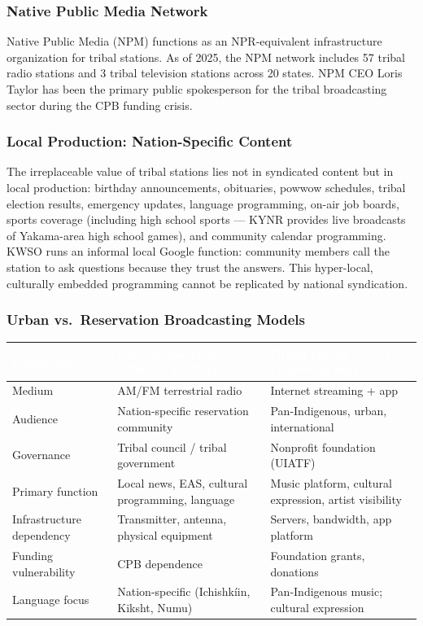\documentclass[11pt,letterpaper]{article}
\newcommand{\tableheader}[1]{\textbf{\sffamily\textcolor{white}{#1}}}
\begin{document}
\subsubsection{Native Public Media Network}

Native Public Media (NPM) functions as an NPR-equivalent infrastructure organization for tribal stations. As of 2025, the NPM network includes 57 tribal radio stations and 3 tribal television stations across 20 states. NPM CEO Loris Taylor has been the primary public spokesperson for the tribal broadcasting sector during the CPB funding crisis.

\subsubsection{Local Production: Nation-Specific Content}

The irreplaceable value of tribal stations lies not in syndicated content but in local production: birthday announcements, obituaries, powwow schedules, tribal election results, emergency updates, language programming, on-air job boards, sports coverage (including high school sports --- KYNR provides live broadcasts of Yakama-area high school games), and community calendar programming. KWSO runs an informal local Google function: community members call the station to ask questions because they trust the answers. This hyper-local, culturally embedded programming cannot be replicated by national syndication.

\subsubsection{Urban vs.\ Reservation Broadcasting Models}

\begin{center}
\begin{tabularx}{\textwidth}{L{3cm}L{4.5cm}L{4.5cm}}
\toprule
{}
\tableheader{Dimension} & \tableheader{Reservation Model (KWSO, KYNR)} & \tableheader{Urban Online Model (Daybreak Star)} \\
\midrule
Medium & AM/FM terrestrial radio & Internet streaming + app \\
Audience & Nation-specific reservation community & Pan-Indigenous, urban, international \\
Governance & Tribal council / tribal government & Nonprofit foundation (UIATF) \\
Primary function & Local news, EAS, cultural programming, language & Music platform, cultural expression, artist visibility \\
Infrastructure dependency & Transmitter, antenna, physical equipment & Servers, bandwidth, app platform \\
Funding vulnerability & CPB dependence & Foundation grants, donations \\
Language focus & Nation-specific (Ichishkíin, Kiksht, Numu) & Pan-Indigenous music; cultural expression \\
\bottomrule
\end{tabularx}
\end{center}
\end{document}
